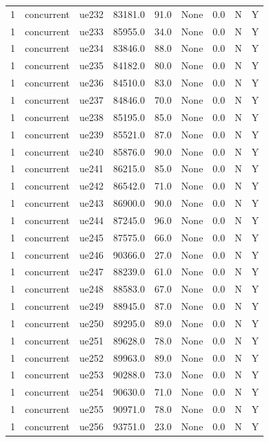 \begin{table}[ht]
\begin{tabular}{|c|c|c|c|c|c|c|c|c|}
1 & concurrent & ue232 & 83181.0 & 91.0 & None & 0.0 & N & Y \\
1 & concurrent & ue233 & 85955.0 & 34.0 & None & 0.0 & N & Y \\
1 & concurrent & ue234 & 83846.0 & 88.0 & None & 0.0 & N & Y \\
1 & concurrent & ue235 & 84182.0 & 80.0 & None & 0.0 & N & Y \\
1 & concurrent & ue236 & 84510.0 & 83.0 & None & 0.0 & N & Y \\
1 & concurrent & ue237 & 84846.0 & 70.0 & None & 0.0 & N & Y \\
1 & concurrent & ue238 & 85195.0 & 85.0 & None & 0.0 & N & Y \\
1 & concurrent & ue239 & 85521.0 & 87.0 & None & 0.0 & N & Y \\
1 & concurrent & ue240 & 85876.0 & 90.0 & None & 0.0 & N & Y \\
1 & concurrent & ue241 & 86215.0 & 85.0 & None & 0.0 & N & Y \\
1 & concurrent & ue242 & 86542.0 & 71.0 & None & 0.0 & N & Y \\
1 & concurrent & ue243 & 86900.0 & 90.0 & None & 0.0 & N & Y \\
1 & concurrent & ue244 & 87245.0 & 96.0 & None & 0.0 & N & Y \\
1 & concurrent & ue245 & 87575.0 & 66.0 & None & 0.0 & N & Y \\
1 & concurrent & ue246 & 90366.0 & 27.0 & None & 0.0 & N & Y \\
1 & concurrent & ue247 & 88239.0 & 61.0 & None & 0.0 & N & Y \\
1 & concurrent & ue248 & 88583.0 & 67.0 & None & 0.0 & N & Y \\
1 & concurrent & ue249 & 88945.0 & 87.0 & None & 0.0 & N & Y \\
1 & concurrent & ue250 & 89295.0 & 89.0 & None & 0.0 & N & Y \\
1 & concurrent & ue251 & 89628.0 & 78.0 & None & 0.0 & N & Y \\
1 & concurrent & ue252 & 89963.0 & 89.0 & None & 0.0 & N & Y \\
1 & concurrent & ue253 & 90288.0 & 73.0 & None & 0.0 & N & Y \\
1 & concurrent & ue254 & 90630.0 & 71.0 & None & 0.0 & N & Y \\
1 & concurrent & ue255 & 90971.0 & 78.0 & None & 0.0 & N & Y \\
1 & concurrent & ue256 & 93751.0 & 23.0 & None & 0.0 & N & Y \\

\end{tabular}
\end{table}
